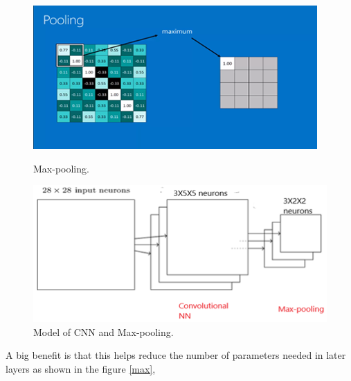 \documentclass{article}
\begin{document}
\begin{figure}[H]
  \centering
  \begin{minipage}[b]{0.6\textwidth}
    \includegraphics[width=\textwidth]{img/max.png}
    \caption{Max-pooling.\protect\cite{CON}}
    \label{max}
  \end{minipage}
  \hfill
  \begin{minipage}[b]{0.6\textwidth}
    \includegraphics[width=\textwidth]{img/max1.png}
    \caption{Model of CNN and Max-pooling.\protect\cite{DL}}
    \label{max1}
  \end{minipage}
\end{figure}

\hfill \break A big benefit is that this helps reduce the number of parameters needed in later layers as shown in the figure \ref{max},
\end{document}
